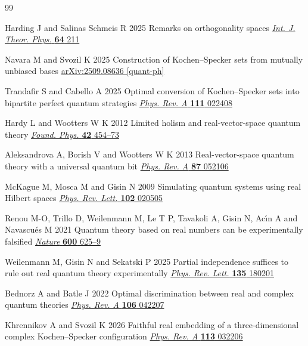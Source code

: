 \documentclass[12pt,a4paper]{article}
\theoremstyle{definition}
\theoremstyle{remark}
\begin{document}
\begin{thebibliography}{99}

Harding J and Salinas Schmeis R 2025 Remarks on orthogonality spaces
\href{https://doi.org/10.1007/s10773-025-06062-x}{\textit{Int. J. Theor. Phys.} \textbf{64} 211}

Navara M and Svozil K 2025 Construction of Kochen--Specker sets from mutually unbiased bases
\href{https://arxiv.org/abs/2509.08636}{arXiv:2509.08636 [quant-ph]}

Trandafir S and Cabello A 2025 Optimal conversion of Kochen--Specker sets into bipartite perfect quantum strategies
\href{https://doi.org/10.1103/PhysRevA.111.022408}{\textit{Phys. Rev. A} \textbf{111} 022408}

Hardy L and Wootters W K 2012 Limited holism and real-vector-space quantum theory
\href{https://doi.org/10.1007/s10701-011-9616-6}{\textit{Found. Phys.} \textbf{42} 454--73}

Aleksandrova A, Borish V and Wootters W K 2013 Real-vector-space quantum theory with a universal quantum bit
\href{https://doi.org/10.1103/PhysRevA.87.052106}{\textit{Phys. Rev. A} \textbf{87} 052106}

McKague M, Mosca M and Gisin N 2009 Simulating quantum systems using real Hilbert spaces
\href{https://doi.org/10.1103/PhysRevLett.102.020505}{\textit{Phys. Rev. Lett.} \textbf{102} 020505}

Renou M-O, Trillo D, Weilenmann M, Le T P, Tavakoli A, Gisin N, Ac\'{\i}n A and Navascu\'{e}s M 2021
Quantum theory based on real numbers can be experimentally falsified
\href{https://doi.org/10.1038/s41586-021-04160-4}{\textit{Nature} \textbf{600} 625--9}

Weilenmann M, Gisin N and Sekatski P 2025 Partial independence suffices to rule out real quantum theory experimentally
\href{https://doi.org/10.1103/3fv7-p8cs}{\textit{Phys. Rev. Lett.} \textbf{135} 180201}

Bednorz A and Batle J 2022 Optimal discrimination between real and complex quantum theories
\href{https://doi.org/10.1103/PhysRevA.106.042207}{\textit{Phys. Rev. A} \textbf{106} 042207}

Khrennikov A and Svozil K 2026 Faithful real embedding of a three-dimensional complex Kochen--Specker configuration
\href{https://doi.org/10.1103/2pf4-bq7p}{\textit{Phys. Rev. A} \textbf{113} 032206}


\end{thebibliography}
\end{document}
